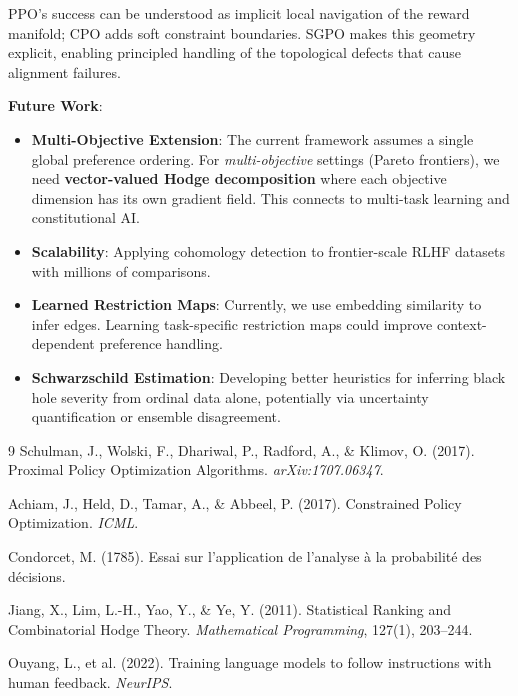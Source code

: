 \documentclass{article}
\begin{document}
PPO's success can be understood as implicit local navigation of the reward manifold; CPO adds soft constraint boundaries. SGPO makes this geometry explicit, enabling principled handling of the topological defects that cause alignment failures.

\textbf{Future Work}:
\begin{itemize}[leftmargin=*]
    \item \textbf{Multi-Objective Extension}: The current framework assumes a single global preference ordering. For \emph{multi-objective} settings (Pareto frontiers), we need \textbf{vector-valued Hodge decomposition} where each objective dimension has its own gradient field. This connects to multi-task learning and constitutional AI.
    
    \item \textbf{Scalability}: Applying cohomology detection to frontier-scale RLHF datasets with millions of comparisons.
    
    \item \textbf{Learned Restriction Maps}: Currently, we use embedding similarity to infer edges. Learning task-specific restriction maps could improve context-dependent preference handling.
    
    \item \textbf{Schwarzschild Estimation}: Developing better heuristics for inferring black hole severity from ordinal data alone, potentially via uncertainty quantification or ensemble disagreement.
\end{itemize}


\begin{thebibliography}{9}
Schulman, J., Wolski, F., Dhariwal, P., Radford, A., \& Klimov, O. (2017).
\newblock Proximal Policy Optimization Algorithms.
\newblock \emph{arXiv:1707.06347}.

Achiam, J., Held, D., Tamar, A., \& Abbeel, P. (2017).
\newblock Constrained Policy Optimization.
\newblock \emph{ICML}.

Condorcet, M. (1785).
\newblock Essai sur l'application de l'analyse \`a la probabilit\'e des d\'ecisions.

Jiang, X., Lim, L.-H., Yao, Y., \& Ye, Y. (2011).
\newblock Statistical Ranking and Combinatorial Hodge Theory.
\newblock \emph{Mathematical Programming}, 127(1), 203--244.

Ouyang, L., et al. (2022).
\newblock Training language models to follow instructions with human feedback.
\newblock \emph{NeurIPS}.
\end{thebibliography}
\end{document}

